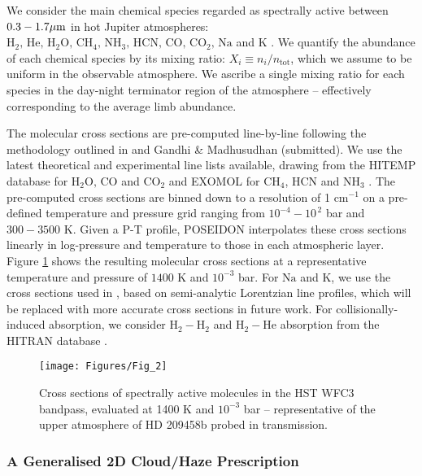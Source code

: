\documentclass[fleqn,usenatbib]{mnras}
\begin{document}
We consider the main chemical species regarded as spectrally active between $0.3-1.7 \hbox{$\mu$m}$ in hot Jupiter atmospheres: $\mathrm{H_2}, \,  \mathrm{He}, \, \mathrm{H_{2}O}, \,  \mathrm{CH_{4}}, \,  \mathrm{NH_{3}}, \,  \mathrm{HCN}, \,  \mathrm{CO}, \, \mathrm{CO_{2}}, \,  \mathrm{Na}$ and $\mathrm{K}$ \citep{seager2000,Madhusudhan2016a}. We quantify the abundance of each chemical species by its mixing ratio: $X_{i} \equiv n_{i}/n_{\mathrm{tot}}$, which we assume to be uniform in the observable atmosphere. We ascribe a single mixing ratio for each species in the day-night terminator region of the atmosphere -- effectively corresponding to the average limb abundance. 

The molecular cross sections are pre-computed line-by-line following the methodology outlined in \citet{Hedges2016} and Gandhi \& Madhusudhan (submitted). We use the latest theoretical and experimental line lists available, drawing from the HITEMP database for $\mathrm{H_{2}O}, \,  \mathrm{CO}$ and $\mathrm{CO_{2}}$ \citep{Rothman2010} and EXOMOL for $\mathrm{CH_{4}}$, HCN and $\mathrm{NH_{3}}$ \citep{Tennyson2016}. The pre-computed cross sections are binned down to a resolution of 1 $\mathrm{cm^{-1}}$ on a pre-defined temperature and pressure grid ranging from $10^{-4} - 10^{\, 2}$ bar and $300 - 3500$ K. Given a P-T profile, POSEIDON interpolates these cross sections linearly in log-pressure and temperature to those in each atmospheric layer. Figure \ref{fig:cross_sections} shows the resulting molecular cross sections at a representative temperature and pressure of $1400$ K and $10^{-3}$ bar. For $\mathrm{Na}$ and $\mathrm{K}$, we use the cross sections used in \citet{Christiansen2010}, based on semi-analytic Lorentzian line profiles, which will be replaced with more accurate cross sections in future work. For collisionally-induced absorption, we consider $\mathrm{H}_{2} - \mathrm{H}_{2}$ and $\mathrm{H}_{2} - \mathrm{He}$ absorption from the HITRAN database \citep{Richard2012a}. 

\begin{figure}
	\texttt{[image: Figures/Fig\_2]}
    \caption{Cross sections of spectrally active molecules in the HST WFC3 bandpass, evaluated at 1400 K and $10^{-3}$ bar -- representative of the upper atmosphere of HD 209458b probed in transmission.}
    \label{fig:cross_sections}
\end{figure}

\subsubsection{A Generalised 2D Cloud/Haze Prescription}\label{subsubsec:clouds}
\end{document}
